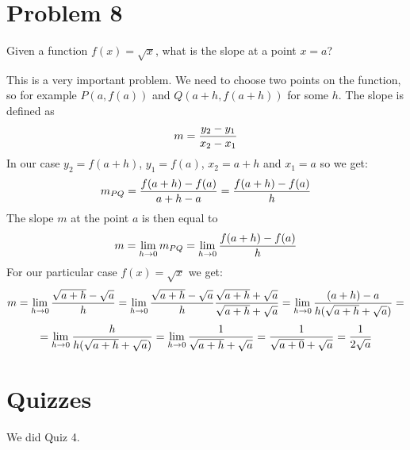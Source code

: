 \documentclass[10pt]{article}
\begin{document}
\section{Problem 8}

Given a function $f(x)=\sqrt x$, what is the slope at a point $x=a$?

This is a very important problem. We need to choose two points on the function,
so for example $P(a, f(a))$ and $Q(a+h, f(a+h))$ for some $h$. The slope is defined as
$$m={y_2-y_1\over x_2-x_1}$$
In our case $y_2=f(a+h)$, $y_1=f(a)$, $x_2=a+h$ and $x_1=a$ so we get:
$$m_{PQ} = {f(a+h)-f(a)\over a+h - a}={f(a+h)-f(a)\over h}$$
The slope $m$ at the point $a$ is then equal to
$$m=\lim_{h\to0} m_{PQ}=\lim_{h\to0}{f(a+h)-f(a)\over h}$$
For our particular case $f(x)=\sqrt x$ we get:
$$m=\lim_{h\to0}{\sqrt{a+h}-\sqrt{a}\over h}
=\lim_{h\to0}{\sqrt{a+h}-\sqrt{a}\over h}
{\sqrt{a+h}+\sqrt{a}\over \sqrt{a+h}+\sqrt{a}}
=\lim_{h\to0}{(a+h)-a\over h(\sqrt{a+h}+\sqrt{a})}=$$
$$=\lim_{h\to0}{h\over h(\sqrt{a+h}+\sqrt{a})}
=\lim_{h\to0}{1\over \sqrt{a+h}+\sqrt{a}}
={1\over \sqrt{a+0}+\sqrt{a}}
={1\over 2\sqrt{a}}$$


\section{Quizzes}

We did Quiz 4.
\end{document}
